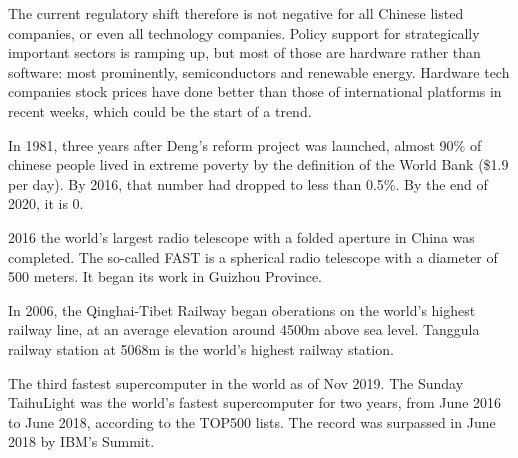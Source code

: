 \vspace{1\baselineskip}

The current regulatory shift therefore is not negative for all Chinese listed
companies, or even all technology companies. Policy support for strategically
important sectors is ramping up, but most of those are hardware rather than
software: most prominently, semiconductors and renewable energy. Hardware
tech companies stock prices have done better than those of international
platforms in recent weeks, which could be the start of a trend.

\vspace{1\baselineskip}

In 1981, three years after Deng's reform project was launched, almost 90\%
of chinese people lived in extreme poverty by the definition of the World
Bank (\$1.9 per day). By 2016, that number had dropped to less than 0.5\%.
By the end of 2020, it is 0.

\vspace{1\baselineskip}

2016 the world's largest radio telescope with a folded aperture in China
was completed. The so-called FAST is a spherical radio telescope with a
diameter of 500 meters. It began its work in Guizhou Province.

\vspace{1\baselineskip}

In 2006, the Qinghai-Tibet Railway began oberations on the world's highest
railway line, at an average elevation around 4500m above sea level. Tanggula
railway station at 5068m is the world's highest railway station.

\vspace{1\baselineskip}

The third fastest supercomputer in the world as of Nov 2019. The Sunday
TaihuLight was the world's fastest supercomputer for two years, from June
2016 to June 2018, according to the TOP500 lists. The record was surpassed
in June 2018 by IBM's Summit.

\vspace{1\baselineskip}

